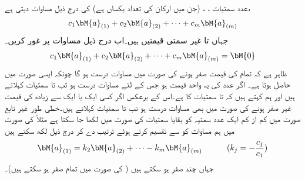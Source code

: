  عدد سمتیات ، ،  (جن میں ارکان کی تعداد یکساں ہے) کی  درج ذیل مساوات دیتی ہے،
\begin{align*}
c_1\bM{a}_{(1)}+c_2\bM{a}_{(2)}+\cdots+c_m\bM{a}_{(m)}
\end{align*}
جہاں  تا  غیر سمتی قیمتیں ہیں۔اب درج ذیل مساوات پر غور کریں۔
\begin{align}\label{مساوات_الجبرا_خطی_غیر_تابعیت_الف}
c_1\bM{a}_{(1)}+c_2\bM{a}_{(2)}+\cdots+c_m\bM{a}_{(m)}=\bM{0}
\end{align}
ظاہر ہے کہ تمام  کی قیمت صفر ہونے کی صورت میں مساوات  درست ہو گا چونکہ ایسی صورت میں  حاصل ہوتا ہے۔ اگر  عدد  کی یہ واحد قیمت ہو جس کے لئے مساوات  درست ہو تب  تا  سمتیات  کہلاتے ہیں اور ہم کہتے ہیں کہ   تا  سمتیات کا  ہے۔اس کے برعکس اگر کسی ایک یا ایک سے زیادہ  کی قیمت غیر صفر ہونے کی صورت میں بھی مساوات  درست ہو تب  تا  سمتیات  کہلاتے ہیں۔خطی طور غیر تابع صورت میں کم از کم ایک عدد سمتیہ کو بقایا سمتیات کی صورت میں لکھا جا سکتا ہے مثلاً  کی صورت میں ہم مساوات  کو  سے تقسیم کرتے ہوئے ترتیب دے کر درج ذیل لکھ سکتے ہیں
\begin{align*}
\bM{a}_{(1)}=k_2\bM{a}_{(2)}+\cdots-k_m\bM{a}_{(m)}   \quad \quad\quad (k_j=-\frac{c_j}{c_1})
\end{align*}
جہاں چند  صفر ہو سکتے ہیں ( کی صورت میں تمام  صفر ہو سکتے ہیں)۔

